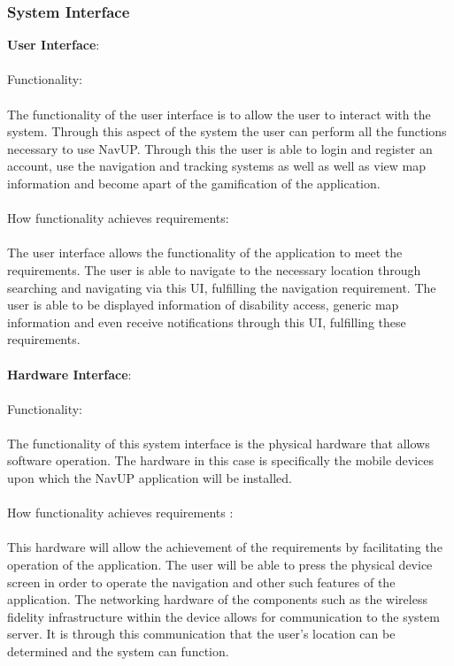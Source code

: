 \documentclass{article}
\begin{document}
        	\subsubsection{System Interface}{
\textbf{User Interface}:\\\\
Functionality:\\\\
The functionality of the user interface is to allow the user to interact with the system. Through this aspect of the system the user can perform all the functions necessary to use NavUP. Through this the user is able to login and register an account, use the navigation and tracking systems as well as well as view map information and become apart of the gamification of the application.\\\\
How functionality achieves requirements:\\\\
The user interface allows the functionality of the application to meet the requirements. The user is able to navigate to the necessary location through searching and navigating via this UI, fulfilling the navigation requirement. The user is able to be displayed information of disability access, generic map information and even receive notifications through this UI, fulfilling these requirements.\\\\
\textbf{Hardware Interface}:\\\\
Functionality:\\\\
The functionality of this system interface is the physical hardware that allows software operation. The hardware in this case is specifically the mobile devices upon which the NavUP application will be installed.\\\\
How functionality achieves requirements :\\\\
This hardware will allow the achievement of the requirements by facilitating the operation of the application. The user will be able to press the physical device screen in order to operate the navigation and other such features of the application. The networking hardware of the components such as the wireless fidelity infrastructure within the device allows for communication to the system server. It is through this communication that the user's location can be determined and the system can function.\\\\
}
\end{document}
